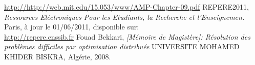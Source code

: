 \documentclass[a4paper,11pt,oneside]{report}
\theoremstyle{plain}
\newcommand{\0}{/ \! \! \! 0}
\theoremstyle{plain}
\begin{document}
\begin{thebibliography}{10}
\url{http://http://web.mit.edu/15.053/www/AMP-Chapter-09.pdf}
REPERE2011,\\
\emph{Ressources El\'ectroniques Pour les Etudiants, la Recherche et l'Enseignemen.}\\
Paris, \`a jour le 01/06/2011, disponible sur:\\
\url{http://repere.enssib.fr}
Fouad Bekkari,
\emph{[M\'emoire de Magist\`ere]: R\'esolution des probl\`emes difficiles par optimisation distribu\'ee}
UNIVERSITE MOHAMED KHIDER BISKRA, Alg\'erie, 2008.

\end{thebibliography}
\end{document}
